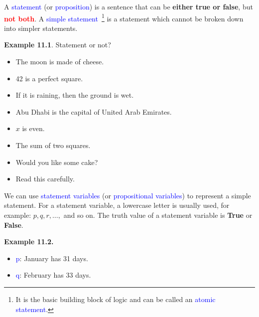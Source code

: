 \documentclass[aspectratio=169]{beamer}
\providecommand{\Blue}[1]{\textcolor{blue}{#1}}
\providecommand{\Red}[1]{\textcolor{red}{#1}}
\begin{document}
\begin{frame}[plain]{}

A \Blue{statement} (or \Blue{proposition}) is a sentence 
that can be {\bf either true or false}, but \Red{\bf not both}.
\pause
  A \Blue{simple statement}~\footnote{It is the basic building block of logic and
   can be called an \Blue{atomic statement}.}
    is a statement
  which cannot be broken down into simpler statements.
    
  
  \medskip
  
  {\bf Example 11.1}. Statement or not? \pause 
   \begin{itemize}
     \item The moon is made of cheese. \pause
     \item 42 is a perfect square. \pause 
    \item If it is raining, then the ground is wet. \pause
    \item Abu Dhabi is the capital of United Arab Emirates.
    \item $x$ is even. \pause
    \item The sum of two squares.
       \pause
    \item Would you like some cake?\pause
    \item Read this carefully. 
   \end{itemize}

\end{frame}


\begin{frame}[plain]{}

We can use \Blue{ statement variables} (or \Blue{propositional variables}) 
 to represent a simple statement.
For a statement variable, a lowercase letter is usually used, for example: $p,q,r,…,$
 and so on.
The truth value of a statement variable  is {\bf True} or {\bf False}.  

\medskip

{\bf Example 11.2.} 
\begin{itemize}
 \item \Blue{p}: January has 31 days.
 \item \Blue{q}: February has 33 days.
\end{itemize}

\vspace{1in}


\end{frame}
\end{document}

